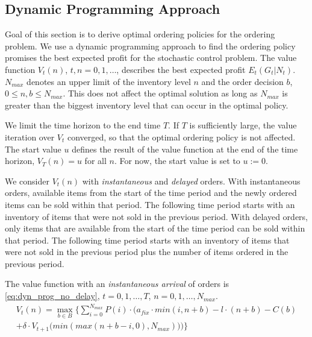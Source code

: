 
\subsection{Dynamic Programming Approach}
\label{section:ordering_solution}

Goal of this section is to derive optimal ordering policies for the ordering problem.
We use a dynamic programming approach to find the ordering policy promises the best expected profit for the stochastic control problem.
The value function $V_t(n)$, $t, n = 0, 1, \ldots$, describes the best expected profit $E_t(G_t | N_t)$.
$N_{max}$ denotes an upper limit of the inventory level $n$ and the order decision $b$, $0 \leq n, b \leq N_{max}$. This does not affect the optimal solution as long as $N_{max}$ is greater than the biggest inventory level that can occur in the optimal policy.

We limit the time horizon to the end time $T$.
If $T$ is sufficiently large, the value iteration over $V_t$ converged, so that the optimal ordering policy is not affected.
The start value $u$ defines the result of the value function at the end of the time horizon, $V_T(n) = u$ for all $n$.
For now, the start value is set to $u := 0$.

We consider $V_t(n)$ with \textit{instantaneous} and \textit{delayed} orders.
With instantaneous orders, available items from the start of the time period and the newly ordered items can be sold within that period.
The following time period starts with an inventory of items that were not sold in the previous period.
With delayed orders, only items that are available from the start of the time period can be sold within that period.
The following time period starts with an inventory of items that were not sold in the previous period plus the number of items ordered in the previous period.

The value function with an \textit{instantaneous arrival} of orders is \cref{eq:dyn_prog_no_delay}, $t=0,1,\ldots,T$, $n=0,1,\ldots,N_{max}$.
\begin{equation}
\begin{split}
V_t(n) = \max_{b \in B} \Bigg\{
\sum_{i = 0}^{N_{max}}
P(i) \cdot \Big(
a_{fix} \cdot min(i, n + b) %
- l \cdot (n + b) %
- C(b) %
 \\
+ \delta \cdot V_{t+1}\big(min(max(n + b - i, 0), N_{max})\big)
\Big)\Bigg\}
\end{split}
\label{eq:dyn_prog_no_delay}
\end{equation}

